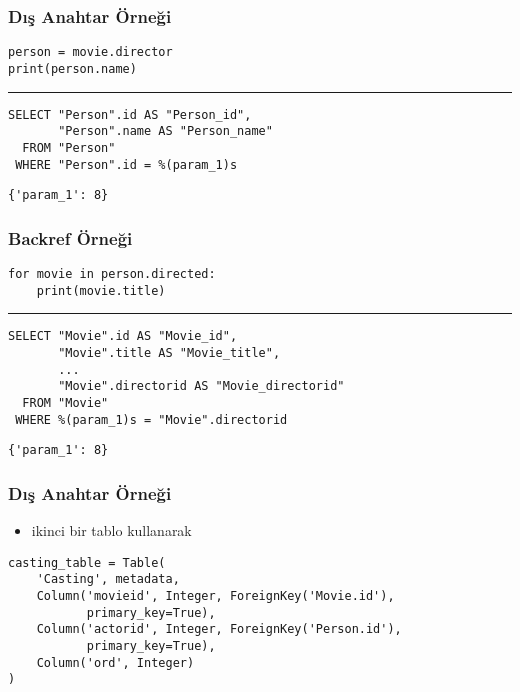 \documentclass[dvipsnames]{beamer}
\theoremstyle{plain}
\begin{document}
\begin{frame}[fragile]
  \frametitle{Dış Anahtar Örneği}

  \begin{lstlisting}
person = movie.director
print(person.name)
  \end{lstlisting}
  \hrule

  \begin{lstlisting}[language=FullSQL]
SELECT "Person".id AS "Person_id",
       "Person".name AS "Person_name"
  FROM "Person"
 WHERE "Person".id = %(param_1)s
  \end{lstlisting}

  \begin{lstlisting}
{'param_1': 8}
  \end{lstlisting}
\end{frame}

\begin{frame}[fragile]
  \frametitle{Backref Örneği}

  \begin{lstlisting}
for movie in person.directed:
    print(movie.title)
  \end{lstlisting}
  \hrule

  \begin{lstlisting}[language=FullSQL]
SELECT "Movie".id AS "Movie_id",
       "Movie".title AS "Movie_title",
       ...
       "Movie".directorid AS "Movie_directorid"
  FROM "Movie"
 WHERE %(param_1)s = "Movie".directorid
  \end{lstlisting}

  \begin{lstlisting}
{'param_1': 8}
  \end{lstlisting}
\end{frame}

\begin{frame}[fragile]
  \frametitle{Dış Anahtar Örneği}

  \begin{itemize}
    \item ikinci bir tablo kullanarak
  \end{itemize}

  \begin{lstlisting}
casting_table = Table(
    'Casting', metadata,
    Column('movieid', Integer, ForeignKey('Movie.id'),
           primary_key=True),
    Column('actorid', Integer, ForeignKey('Person.id'),
           primary_key=True),
    Column('ord', Integer)
)
  \end{lstlisting}
\end{frame}
\end{document}
